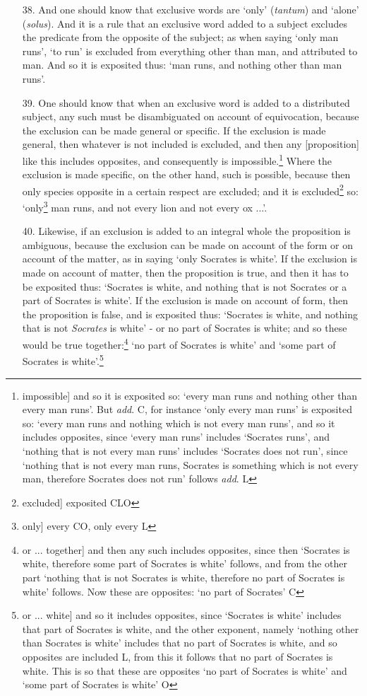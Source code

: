 \begin{itemize}
\item[38.] And one should know that exclusive words are `only' (\textit{tantum}) and `alone' (\textit{solus}). And it is a rule that an exclusive word added to a subject excludes the predicate from the opposite of the subject; as when saying `only man runs', `to run' is excluded from everything other than man, and attributed to man. And so it is exposited thus: `man runs, and nothing other than man runs'.
\item[39.] One should know that when an exclusive word is added to a distributed subject, any such must be disambiguated on account of equivocation, because the exclusion can be made general or specific. If the exclusion is made general, then whatever is not included is excluded, and then any [proposition] like this includes opposites, and consequently is impossible.\footnote{impossible] and so it is exposited so: `every man runs and nothing other than every man runs'. But \textit{add}. C, for instance `only every man runs' is exposited so: `every man runs and nothing which is not every man runs', and so it includes opposites, since `every man runs' includes `Socrates runs', and `nothing that is not every man runs' includes `Socrates does not run', since `nothing that is not every man runs, Socrates is something which is not every man, therefore Socrates does not run' follows \textit{add}. L} Where the exclusion is made specific, on the other hand, such is possible, because then only species opposite in a certain respect are excluded; and it is excluded\footnote{excluded] exposited CLO} so: `only\footnote{only] every CO, only every L} man runs, and not every lion and not every ox ...'.
\item[40.] Likewise, if an exclusion is added to an integral whole the proposition is ambiguous, because the exclusion can be made on account of the form or on account of the matter, as in saying `only Socrates is white'. If the exclusion is made on account of matter, then the proposition is true, and then it has to be exposited thus: `Socrates is white, and nothing that is not Socrates or a part of Socrates is white'. If the exclusion  is made on account of form, then the proposition is false, and is exposited thus: `Socrates is white, and nothing that is not \textit{Socrates} is white' - or no part of Socrates is white; and so these would be true together:\footnote{or ... together] and then any such includes opposites, since then `Socrates is white, therefore some part of Socrates is white' follows, and from the other part `nothing that is not Socrates is white, therefore no part of Socrates is white' follows. Now these are opposites: `no part of Socrates' C} `no part of Socrates is white' and `some part of Socrates is white'.\footnote{or ... white] and so it includes opposites, since `Socrates is white' includes that part of Socrates is white, and the other exponent, namely `nothing other than Socrates is white' includes that no part of Socrates is white, and so opposites are included L, from this it follows that no part of Socrates is white. This is so that these are opposites `no part of Socrates is white' and `some part of Socrates is white' O}

\end{itemize}
